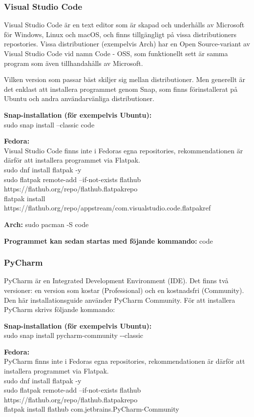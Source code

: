 \documentclass{TDP003mall}
\begin{document}
\subsubsection*{Visual Studio Code}

Visual Studio Code är en text editor som är skapad och underhålls av Microsoft för Windows, Linux och macOS, och finns tillgängligt på vissa distributioners repostories. Vissa distributioner (exempelvis Arch) har en Open Source-variant av Visual Studio Code vid namn Code - OSS, som funktionellt sett är samma program som även tillhandahålls av Microsoft.

Vilken version som passar bäst skiljer sig mellan distributioner. Men generellt är det enklast att installera programmet genom Snap, som finns förinstallerat på Ubuntu och andra användarvänliga distributioner.

\textbf{Snap-installation (för exempelvis Ubuntu):}\\
sudo snap install --classic code

\textbf{Fedora:}\\
Visual Studio Code finns inte i Fedoras egna repositories, rekommendationen är därför att installera programmet via Flatpak.\\
sudo dnf install flatpak -y\\
sudo flatpak remote-add --if-not-exists flathub https://flathub.org/repo/flathub.flatpakrepo\\
flatpak install https://flathub.org/repo/appstream/com.visualstudio.code.flatpakref

\textbf{Arch:}
sudo pacman -S code

\textbf{Programmet kan sedan startas med föjande kommando:}
code

\subsubsection*{PyCharm}

PyCharm är en Integrated Development Environment (IDE). Det finns två versioner: en version som kostar (Professional) och en kostnadsfri (Community). Den här installationsguide använder PyCharm Community.
För att installera PyCharm skrivs följande kommando:

\textbf{Snap-installation (för exempelvis Ubuntu):}\\
sudo snap install pycharm-community -{}-classic

\textbf{Fedora:}\\
PyCharm finns inte i Fedoras egna repositories, rekommendationen är därför att installera programmet via Flatpak.\\
sudo dnf install flatpak -y\\
sudo flatpak remote-add --if-not-exists flathub https://flathub.org/repo/flathub.flatpakrepo\\
flatpak install flathub com.jetbrains.PyCharm-Community
\end{document}
